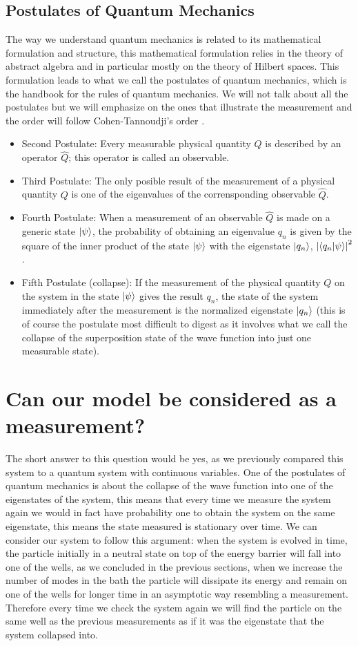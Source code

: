 \subsection{Postulates of Quantum Mechanics}
The way we understand quantum mechanics is related to its mathematical formulation and structure, this mathematical formulation relies in the theory of abstract algebra and in particular mostly on the theory of Hilbert spaces. This formulation leads to what we call the postulates of quantum mechanics, which is the handbook for the rules of quantum mechanics. We will not talk about all the postulates but we will emphasize on the ones that illustrate the measurement and the order will follow Cohen-Tannoudji’s order \cite{cohen1978quantum}.
\begin{itemize}
\item Second Postulate: Every measurable physical quantity $Q$ is described by an operator $\hat{Q}$; this operator is called an observable.
\item Third Postulate: The only posible result of the measurement of a physical quantity $Q$ is one of the eigenvalues of the corrensponding observable $\hat{Q}$.
\item  Fourth Postulate: When a measurement of an observable $\hat{Q}$ is made on a generic state $\ket{\psi}$, the probability of obtaining an eigenvalue $q_n$ is given by the square of the inner product of the state $\ket{\psi}$ with the eigenstate $\ket{q_n}$, $\abs{\bra{q_n} \ket{\psi}}^2$.
\item Fifth Postulate (collapse): If the measurement of the physical quantity $Q$ on the system in the state $\ket{\psi}$ gives the result $q_n$, the state of the system immediately after the measurement is the normalized eigenstate $\ket{q_n}$ (this is of course the postulate most difficult to digest as it involves what we call the collapse of the superposition state of the wave function into just one measurable state).
\end{itemize}



\section{Can our model be considered as a measurement?}
The short answer to this question would be yes, as we previously compared this system to a quantum system with continuous variables. One of the postulates of quantum mechanics is about the collapse of the wave function into one of the eigenstates of the system, this means that every time we measure the system again we would in fact have probability one to obtain the system on the same eigenstate, this means the state measured is stationary over time. We can consider our system to follow this argument: when the system is evolved in time, the particle initially in a neutral state on top of the energy barrier will fall into one of the wells, as we concluded in the previous sections, when we increase the number of modes in the bath the particle will dissipate its energy and remain on one of the wells for longer time in an asymptotic way resembling a measurement. Therefore every time we check the system again we will find the particle on the same well as the previous measurements as if it was the eigenstate that the system collapsed into.